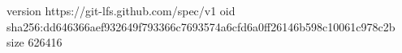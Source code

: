 version https://git-lfs.github.com/spec/v1
oid sha256:dd646366aef932649f793366c7693574a6cfd6a0ff26146b598c10061c978c2b
size 626416
